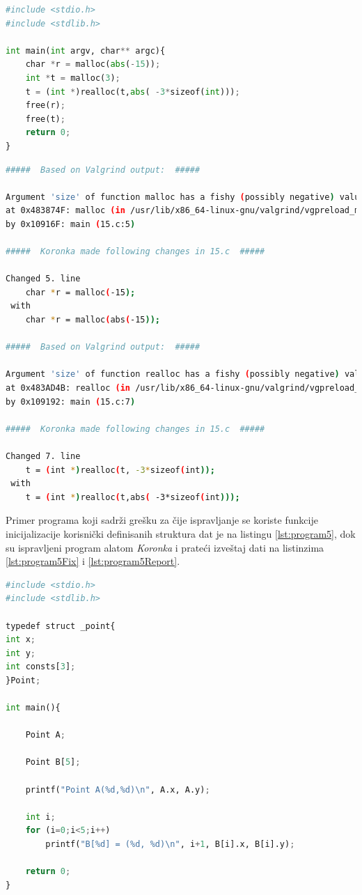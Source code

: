 \documentclass[12pt,oneside]{memoir}
\theoremstyle{plain}
\theoremstyle{definition}
\begin{document}
\begin{lstlisting}[style=mystyle,caption={Ispravljeni program sa listinga \ref{lst:program4} alatom \textit{Koronka}}, label={lst:program4Fix},language={Python}] 
#include <stdio.h>
#include <stdlib.h>

int main(int argv, char** argc){
	char *r = malloc(abs(-15));
	int *t = malloc(3);
	t = (int *)realloc(t,abs( -3*sizeof(int))); 
	free(r);
	free(t);
	return 0;
}
\end{lstlisting}

\begin{lstlisting}[style=terminal,caption={Izveštaj o radu alata \textit{Koronka} za program sa listinga \ref{lst:program4}}, label={lst:program4Report},language={bash}]   
#####  Based on Valgrind output:  #####

Argument 'size' of function malloc has a fishy (possibly negative) value: -15
at 0x483874F: malloc (in /usr/lib/x86_64-linux-gnu/valgrind/vgpreload_memcheck-amd64-linux.so)
by 0x10916F: main (15.c:5)

#####  Koronka made following changes in 15.c  #####

Changed 5. line 
	char *r = malloc(-15);
 with 
	char *r = malloc(abs(-15));

#####  Based on Valgrind output:  #####

Argument 'size' of function realloc has a fishy (possibly negative) value: -12
at 0x483AD4B: realloc (in /usr/lib/x86_64-linux-gnu/valgrind/vgpreload_memcheck-amd64-linux.so)
by 0x109192: main (15.c:7)

#####  Koronka made following changes in 15.c  #####

Changed 7. line 
	t = (int *)realloc(t, -3*sizeof(int)); 
 with 
	t = (int *)realloc(t,abs( -3*sizeof(int))); 

\end{lstlisting}

Primer programa koji sadrži grešku za čije ispravljanje se koriste funkcije inicijalizacije korisnički definisanih struktura dat je na listingu \ref{lst:program5}, dok su ispravljeni program alatom \textit{Koronka} i prateći izveštaj dati na listinzima \ref{lst:program5Fix} i \ref{lst:program5Report}.

\begin{lstlisting}[style=mystyle,caption={Program koji sadrži grešku za čije ispravljanje se koriste funkcije inicijalizacije korisnički definisanih struktura}, label={lst:program5},language={Python}] 
#include <stdio.h>
#include <stdlib.h>

typedef struct _point{
int x;
int y;
int consts[3];
}Point;

int main(){

	Point A;

	Point B[5];

	printf("Point A(%d,%d)\n", A.x, A.y);
	
	int i;
	for (i=0;i<5;i++)
		printf("B[%d] = (%d, %d)\n", i+1, B[i].x, B[i].y);

	return 0;
}
\end{lstlisting}
\end{document}
